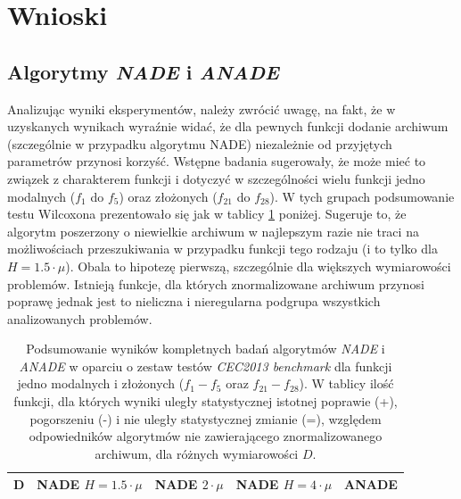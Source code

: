 \documentclass[12pt,a4paper]{report}
\begin{document}
{{{{{{{\section{Wnioski}
\subsection{Algorytmy \emph{NADE} i \emph{ANADE}}
\par{
Analizując wyniki eksperymentów, należy zwrócić uwagę, na fakt, że w uzyskanych wynikach wyraźnie widać, że dla pewnych funkcji dodanie archiwum (szczególnie w przypadku algorytmu NADE) niezależnie od przyjętych parametrów przynosi korzyść. Wstępne badania sugerowały, że może mieć to związek z charakterem funkcji i dotyczyć w szczególności wielu funkcji jedno modalnych ($f_1$ do $f_5$) oraz złożonych ($f_{21}$ do $f_{28}$). W tych grupach podsumowanie testu Wilcoxona prezentowało się jak w tablicy \ref{FULLSUMMARYUNIandCOMPLEX} poniżej. Sugeruje to, że algorytm poszerzony o niewielkie archiwum w najlepszym razie nie traci na możliwościach przeszukiwania w przypadku funkcji tego rodzaju (i to tylko dla $H = 1.5 \cdot \mu$). Obala to hipotezę pierwszą, szczególnie dla większych wymiarowości problemów. Istnieją funkcje, dla których znormalizowane archiwum przynosi poprawę jednak jest to nieliczna i nieregularna podgrupa wszystkich analizowanych problemów.
}
\begin{table}[h]
\centering
\caption{Podsumowanie wyników kompletnych badań algorytmów \emph{NADE} i \emph{ANADE} w oparciu o zestaw testów \emph{CEC2013 benchmark} dla funkcji jedno modalnych i złożonych ($f_1 - f_5$ oraz $f_{21} - f_{28}$). W tablicy ilość funkcji, dla których wyniki uległy statystycznej istotnej poprawie (+), pogorszeniu (-) i nie uległy statystycznej zmianie (=), względem odpowiedników algorytmów nie zawierającego znormalizowanego archiwum, dla różnych wymiarowości $D$.}
\label{FULLSUMMARYUNIandCOMPLEX}
\begin{tabular}{|c|c|c|c|c|c|c|c|c|c|c|c|c|}
\hline
{\bf D}  & \multicolumn{3}{c|}{{\bf NADE $H=1.5 \cdot \mu$}} & \multicolumn{3}{c|}{{\bf NADE $2 \cdot \mu$}} & \multicolumn{3}{c|}{{\bf NADE $H=4 \cdot \mu$}} & \multicolumn{3}{c|}{{\bf ANADE}} \\ \hline

\end{tabular}
\end{table}}}}}}}}
\end{document}
